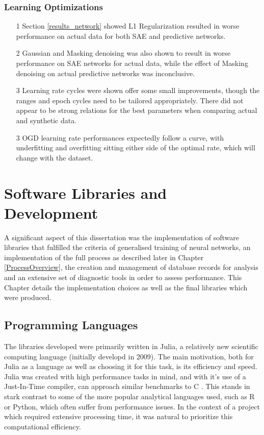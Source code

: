 \documentclass[a4paper,11pt,oneside]{article}
\theoremstyle{plain}
\theoremstyle{definition}
\begin{document}
\subsubsection{Learning Optimizations}
\begin{itemize}
	\item[1] Section \ref{results_network} showed L1 Regularization resulted in worse performance on actual data for both SAE and predictive networks.
	\item[2] Gaussian and Masking denoising was also shown to result in worse performance on SAE networks for actual data, while the effect of Masking denoising on actual predictive networks was inconclusive.
	\item[3] Learning rate cycles were shown offer some small improvements, though the ranges and epoch cycles need to be tailored appropriately. There did not appear to be strong relations for the best parameters when comparing actual and synthetic data.
	\item[3] OGD learning rate performances expectedly follow a curve, with underfitting and overfitting sitting either side of the optimal rate, which will change with the dataset.
\end{itemize}







\newpage
\section{Software Libraries and Development}\label{Software}

A significant aspect of this dissertation was the implementation of software libraries that fulfilled the criteria of generalised training of neural networks, an implementation of the full process as described later in Chapter \ref{ProcessOverview}, the creation and management of database records for analysis and an extensive set of diagnostic tools in order to assess performance. This Chapter details the implementation choices as well as the final libraries which were produced.


\subsection{Programming Languages}

The libraries developed were primarily written in Julia, a relatively new scientific computing language (initially developd in 2009). The main motivation, both for Julia as a language as well as choosing it for this task, is its efficiency and speed. Julia was created with high performance tasks in mind, and with it's use of a Just-In-Time compiler, can approach similar benchmarks to C \cite{Perkel}. This stands in stark contrast to some of the more popular analytical languages used, such as R or Python, which often suffer from performance issues. In the context of a project which required extensive processing time, it was natural to prioritize this computational efficiency. \newline
\end{document}
